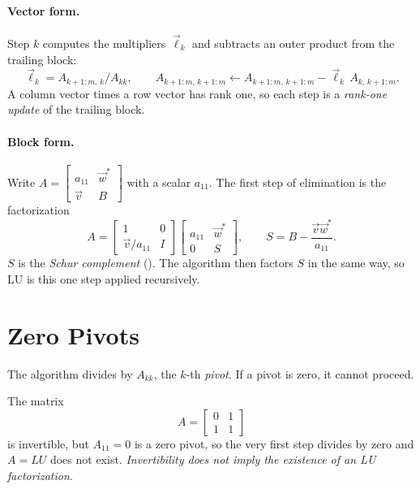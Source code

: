 \paragraph{Vector form.} Step $k$ computes the multipliers $\vec{\ell}_k$ and subtracts an outer product from the trailing block:
\begin{equation}
  \vec{\ell}_k = A_{k+1:m,\,k} / A_{kk}, \qquad
  A_{k+1:m,\,k+1:m} \gets A_{k+1:m,\,k+1:m} - \vec{\ell}_k\,A_{k,\,k+1:m}.
\end{equation}
A column vector times a row vector has rank one, so each step is a \emph{rank-one update} of the trailing block.

\paragraph{Block form.} Write $A = \left[\begin{smallmatrix} a_{11} & \vec{w}^\ast \\ \vec{v} & B \end{smallmatrix}\right]$ with a scalar $a_{11}$. The first step of elimination is the factorization
\begin{equation}
  A = \begin{bmatrix} 1 & 0 \\ \vec{v}/a_{11} & I \end{bmatrix}
      \begin{bmatrix} a_{11} & \vec{w}^\ast \\ 0 & S \end{bmatrix},
  \qquad S = B - \frac{\vec{v}\vec{w}^\ast}{a_{11}}.
\end{equation}
$S$ is the \emph{Schur complement} (). The algorithm then factors $S$ in the same way, so LU is this one step applied recursively.

\section{Zero Pivots}

The algorithm divides by $A_{kk}$, the $k$-th \emph{pivot}. If a pivot is zero, it cannot proceed.

\begin{example}
  The matrix
  \begin{equation}
    A = \begin{bmatrix} 0 & 1 \\ 1 & 1 \end{bmatrix}
  \end{equation}
  is invertible, but $A_{11} = 0$ is a zero pivot, so the very first step divides by zero and $A = LU$ does not exist. \emph{Invertibility does not imply the existence of an LU factorization.}
\end{example}

